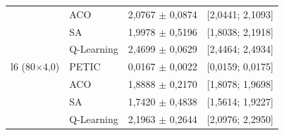 \begin{table}[htb]
\begin{tabular}{llcc}
         & ACO & 2,0767 $\pm$ 0,0874 & [2,0441; 2,1093] \\
         & SA & 1,9978 $\pm$ 0,5196 & [1,8038; 2,1918] \\
         & Q-Learning & 2,4699 $\pm$ 0,0629 & [2,4464; 2,4934] \\
        \hline
        l6 (80$\times$4,0) & PETIC & 0,0167 $\pm$ 0,0022 & [0,0159; 0,0175] \\
         & ACO & 1,8888 $\pm$ 0,2170 & [1,8078; 1,9698] \\
         & SA & 1,7420 $\pm$ 0,4838 & [1,5614; 1,9227] \\
         & Q-Learning & 2,1963 $\pm$ 0,2644 & [2,0976; 2,2950] \\
        \hline
    \end{tabular}
\end{table}
